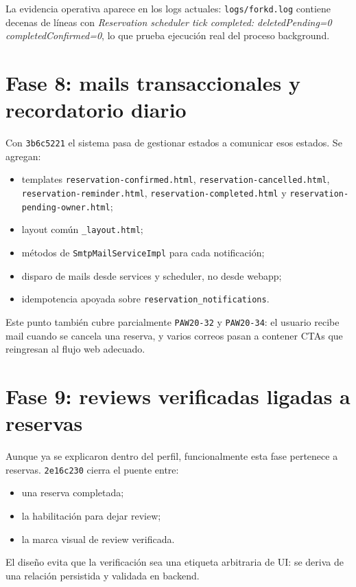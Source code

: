 \documentclass[11pt,a4paper]{report}
\newcommand{\commit}[1]{\texttt{#1}}
\newcommand{\code}[1]{\nolinkurl{#1}}
\newcommand{\story}[1]{\texttt{#1}}
\begin{document}
La evidencia operativa aparece en los logs actuales: \code{logs/forkd.log} contiene decenas de l\'ineas con \emph{Reservation scheduler tick completed: deletedPending=0 completedConfirmed=0}, lo que prueba ejecuci\'on real del proceso background.

\section{Fase 8: mails transaccionales y recordatorio diario}

Con \commit{3b6c5221} el sistema pasa de gestionar estados a comunicar esos estados. Se agregan:

\begin{itemize}
  \item templates \code{reservation-confirmed.html}, \code{reservation-cancelled.html}, \code{reservation-reminder.html}, \code{reservation-completed.html} y \code{reservation-pending-owner.html};
  \item layout com\'un \code{_layout.html};
  \item m\'etodos de \code{SmtpMailServiceImpl} para cada notificaci\'on;
  \item disparo de mails desde services y scheduler, no desde webapp;
  \item idempotencia apoyada sobre \code{reservation\_notifications}.
\end{itemize}

Este punto tambi\'en cubre parcialmente \story{PAW20-32} y \story{PAW20-34}: el usuario recibe mail cuando se cancela una reserva, y varios correos pasan a contener CTAs que reingresan al flujo web adecuado.

\section{Fase 9: reviews verificadas ligadas a reservas}

Aunque ya se explicaron dentro del perfil, funcionalmente esta fase pertenece a reservas. \commit{2e16c230} cierra el puente entre:

\begin{itemize}
  \item una reserva completada;
  \item la habilitaci\'on para dejar review;
  \item la marca visual de review verificada.
\end{itemize}

El dise\~no evita que la verificaci\'on sea una etiqueta arbitraria de UI: se deriva de una relaci\'on persistida y validada en backend.
\end{document}
